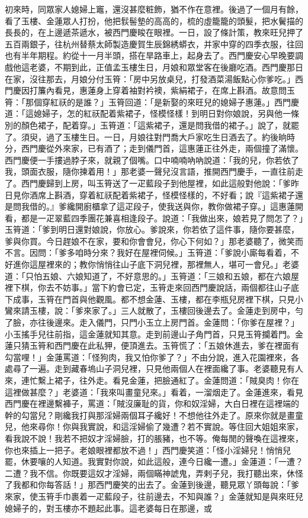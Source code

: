 初來時，同眾家人媳婦上竈，還沒甚麼粧飾，猶不作在意裡。後過了一個月有餘，看了玉樓、金蓮眾人打扮，他把䯼髻墊的高高的，梳的虛籠籠的頭髮，把水鬢描的長長的，在上邊遞茶遞水，被西門慶睃在眼裡。一日，設了條計策，教來旺兒押了五百兩銀子，往杭州替蔡太師製造慶賀生辰錦綉蟒衣，并家中穿的四季衣服，往回也有半年期程。約從十一月半頭，搭在旱路車上，起身去了。西門慶安心早晚要調戲他這老婆，不期到此，正值孟玉樓生日，月娘和眾堂客在後廳吃酒。西門慶那日在家，沒往那去，月娘分付玉筲：「房中另放桌兒，打發酒菜湯飯點心你爹吃。」西門慶因打簾內看見，惠蓮身上穿着袖對衿襖，紫絹裙子，在席上斟酒。故意問玉筲：「那個穿紅祆的是誰？」玉筲回道：「是新娶的來旺兒的媳婦子惠蓮。」西門慶道：「這媳婦子，怎的紅祆配着紫裙子，怪模怪樣！到明日對你娘說，另與他一條別的顏色裙子，配着穿。」玉筲道：「這紫裙子，還是問我借的裙子。」說了，就罷了。須臾，過了玉樓生日。一日，月娘往對門喬大戶家吃生日酒去了。約後晌時分，西門慶從外來家，已有酒了；走到儀門首，這惠蓮正往外走，兩個撞了滿懷。西門慶便一手摟過脖子來，就親了個嘴。口中喃喃吶吶說道：「我的兒，你若依了我，頭面衣服，隨你揀着用！」那老婆一聲兒沒言語，推開西門慶手，一直往前走了。西門慶歸到上房，叫玉筲送了一疋藍段子到他屋裡，如此這般對他說：「爹昨日見你酒席上斟酒，穿着紅祆配着紫裙子，怪模怪樣的，不好看；說『這紫裙子還是問我借的。』爹纔開廚櫃拿了這疋段子，使我送與你，教你做裙子穿。」這惠蓮開看，都是一疋翠藍四季團花兼喜相逢段子。說道：「我做出來，娘若見了問怎了？」玉筲道：「爹到明日還對娘說，你放心。爹說來，你若依了這件事，隨你要甚麼，爹與你買。今日趕娘不在家，要和你會會兒，你心下何如？」那老婆聽了，微笑而不言。因問：「爹多咱時分來？我好在屋裡伺候。」玉筲道：「爹說小廝每看着，不好進你這屋裡來的；教你悄悄往山子底下洞兒裡，那裡無人，堪可一會兒。」老婆道：「只怕五娘、六娘知道了，不好意思的。」玉筲道：「三娘和五娘，都在六娘屋裡下棋，你去不妨事。」當下約會已定，玉筲走來回西門慶說話，兩個都往山子底下成事，玉筲在門首與他觀風。都不想金蓮、玉樓，都在李瓶兒房裡下棋，只見小鸞來請玉樓，說：「爹來家了。」三人就散了，玉樓回後邊去了。金蓮走到房中，勻了臉，亦往後邊來。走入儀門，只門小玉立上房門首。金蓮問：「你爹在屋裡？」小玉搖手兒往前指，這金蓮就知其意。走到前邊山子角門首，只見玉筲攔着門。金蓮只猜玉筲和西門慶在此私狎，便頂進去。玉筲慌了：「五娘休進去，爹在裡面有勾當哩！」金蓮罵道：「怪狗肉，我又怕你爹了？」不由分說，進入花園裡來，各處尋了一遍。走到藏春塢山子洞兒裡，只見他兩個人在裡面纔了事。老婆聽見有人來，連忙繫上裙子，往外走。看見金蓮，把臉通紅了。金蓮問道：「賊臭肉！你在這裡做甚麼？」老婆道：「我來叫畫童兒來。」看着，一溜烟走了。金蓮進來，看見西門慶在裡邊繫褲子，罵道：「賊沒廉耻的貨，你和奴淫婦，大白日裡在這裡端的幹的勾當兒？剛纔我打與那淫婦兩個耳子纔好！不想他往外走了。原來你就是畫童兒，他來尋你！你與我實說，和這淫婦偷了幾遭？若不實說。等住回大姐姐來家，看我說不說！我若不把奴才淫婦臉，打的脹豬，也不等。俺每閒的聲喚在這裡來，你也來插上一把子。老娘眼裡都放不過！」西門慶笑道：「怪小淫婦兒！悄悄兒罷，休要嚷的人知道。我實對你說，如此這般，連今日纔一遭。」金蓮道：「一遭？二遭？我不信。你既要這奴才淫婦，兩個瞞神諕鬼，弄剌子兒，我打聽出來，休怪了我都和你每答話！」那西門慶笑的出去了。金蓮到後邊，聽見眾丫頭每說：「爹來家，使玉筲手巾裹着一疋藍段子，往前邊去，不知與誰？」金蓮就知是與來旺兒媳婦子的，對玉樓亦不題起此事。這老婆每日在那邊，或